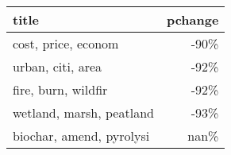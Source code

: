 \begin{tabular}{lr}
\toprule
                    title &  pchange \\
\midrule
      cost, price, econom &     -90\% \\
        urban, citi, area &     -92\% \\
      fire, burn, wildfir &     -92\% \\
 wetland, marsh, peatland &     -93\% \\
 biochar, amend, pyrolysi &     nan\% \\
\bottomrule
\end{tabular}
